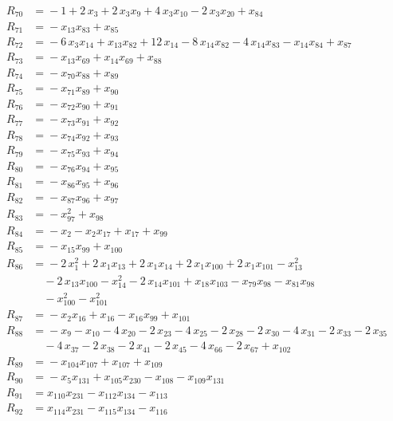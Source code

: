 \begin{align*}
R_{70} &={} -1 +2\,x_{3} +2\,x_{3} x_{9} +4\,x_{3} x_{10} -2\,x_{3} x_{20} +x_{84} \\[2pt]
R_{71} &={} -x_{13} x_{83} +x_{85} \\[2pt]
R_{72} &={} -6\,x_{3} x_{14} +x_{13} x_{82} +12\,x_{14} -8\,x_{14} x_{82} -4\,x_{14} x_{83} -x_{14} x_{84} +x_{87} \\[2pt]
R_{73} &={} -x_{13} x_{69} +x_{14} x_{69} +x_{88} \\[2pt]
R_{74} &={} -x_{70} x_{88} +x_{89} \\[2pt]
R_{75} &={} -x_{71} x_{89} +x_{90} \\[2pt]
R_{76} &={} -x_{72} x_{90} +x_{91} \\[2pt]
R_{77} &={} -x_{73} x_{91} +x_{92} \\[2pt]
R_{78} &={} -x_{74} x_{92} +x_{93} \\[2pt]
R_{79} &={} -x_{75} x_{93} +x_{94} \\[2pt]
R_{80} &={} -x_{76} x_{94} +x_{95} \\[2pt]
R_{81} &={} -x_{86} x_{95} +x_{96} \\[2pt]
R_{82} &={} -x_{87} x_{96} +x_{97} \\[2pt]
R_{83} &={} -x_{97}^{2} +x_{98} \\[2pt]
R_{84} &={} -x_{2} -x_{2} x_{17} +x_{17} +x_{99} \\[2pt]
R_{85} &={} -x_{15} x_{99} +x_{100} \\[2pt]
R_{86} &={} -2\,x_{1}^{2} +2\,x_{1} x_{13} +2\,x_{1} x_{14} +2\,x_{1} x_{100} +2\,x_{1} x_{101} -x_{13}^{2} \\
&\quad{} -2\,x_{13} x_{100} -x_{14}^{2} -2\,x_{14} x_{101} +x_{18} x_{103} -x_{79} x_{98} -x_{81} x_{98} \\
&\quad{} -x_{100}^{2} -x_{101}^{2} \\[2pt]
R_{87} &={} -x_{2} x_{16} +x_{16} -x_{16} x_{99} +x_{101} \\[2pt]
R_{88} &={} -x_{9} -x_{10} -4\,x_{20} -2\,x_{23} -4\,x_{25} -2\,x_{28} -2\,x_{30} -4\,x_{31} -2\,x_{33} -2\,x_{35} \\
&\quad{} -4\,x_{37} -2\,x_{38} -2\,x_{41} -2\,x_{45} -4\,x_{66} -2\,x_{67} +x_{102} \\[2pt]
R_{89} &={} -x_{104} x_{107} +x_{107} +x_{109} \\[2pt]
R_{90} &={} -x_{5} x_{131} +x_{105} x_{230} -x_{108} -x_{109} x_{131} \\[2pt]
R_{91} &={} x_{110} x_{231} -x_{112} x_{134} -x_{113} \\[2pt]
R_{92} &={} x_{114} x_{231} -x_{115} x_{134} -x_{116} \\[2pt]

\end{align*}
